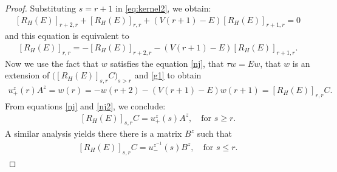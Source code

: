 \documentclass[10pt,a4paper]{amsart}
\begin{document}
\begin{proof}
Substituting \(s = r+1\) in \eqref{eq:kernel2}, we obtain:
\begin{align}\label{g}
     [R_{H}(E)]_{r+2,r} + [R_{H}(E)]_{r,r} + (V(r+1) - E)[R_{H}(E)]_{ r+1,r} = 0
\end{align}
  and this equation is equivalent to 
  \begin{align}\label{g1}
      [R_{H}(E)]_{r,r} =-  [R_{H}(E)]_{r+2,r}-(V(r+1) - E)[R_{H}(E)]_{r+1,r}.
\end{align}
Now we use the fact that $w$ satisfies the equation  \eqref{nj}, that  $\tau w=Ew$, that $  w $ is an extension   of  \( \Big (  [R_{H}(E)]_{s,r}C \Big )_ {s>r}\) and  \eqref{g1} to obtain 
    \begin{align}\label{nj2}
u_{+}^{z}(r) A^{z} = w(r) = - w(r+2) -(V(r+1) - E ) w(r+1) =      [R_{H}(E)]_{r,r}C .
\end{align}
From equations \eqref{nj} and \eqref{nj2}, we conclude:
\begin{align} \label{nj3}
     [R_{H}(E)]_{s,r}C = u_{+}^{z}(s) A^{z}, \quad \text{for } s \geq r.
\end{align}
A similar analysis yields there there is a matrix $B^z$ such that 
\begin{align} \label{nj4}
     [R_{H}(E)]_{s,r}C= u_{-}^{z^{-1}}(s) B^{z}, \quad \text{for } s \leq r.
\end{align}


\end{proof}
\end{document}
